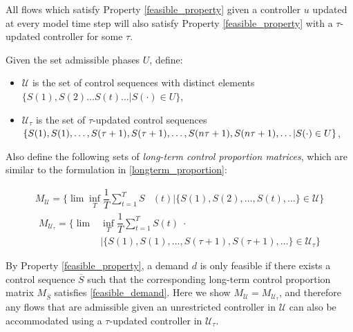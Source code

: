 \label{tauadmissible}
\begin{Lem}
All flows which satisfy Property \ref{feasible_property} given a controller $u$ updated at every model time step will also satisfy Property \ref{feasible_property} with a $\tau$-updated controller for some $\tau$. 
\end{Lem}
\begin{IEEEproof}
Given the set admissible phases $U$, define:
\begin{itemize}
\item $\mathcal U$ is the set of control sequences with distinct elements $\{S(1), S(2) \ldots S(t) \ldots |  S(\cdot) \in U\} $,
\item $\mathcal U_{\tau}$ is the set of $\tau$-updated control sequences $\{S(1), S(1), \ldots ,  S(\tau + 1),S(\tau + 1), \ldots , S(n\tau + 1), \\  S(n\tau + 1), \ldots |  S(\cdot) \in U\} $, 
\end{itemize}
Also define the following sets of \emph{long-term control proportion matrices}, which are similar to the formulation in \eqref{longterm_proportion}:
\vspace{-.5em}
\begin{small}
\begin{align*} M_{\mathcal U} = \Big\{\lim \inf_{T}\dfrac{1}{T}\sum_{t=1}^{T}  S&(t)  \Big| \{S(1), S(2), \ldots, S(t), \ldots \}\in \mathcal U \Big\} \end{align*}
\vspace{-1em}
\begin{align*} M_{\mathcal U_\tau} = \Big\{\lim&\inf_{T} \dfrac{1}{T}\sum_{t=1}^{T} S(t) \; \cdot \\ 
& \Big|\{S(1), S(1), \ldots,  S(\tau+1),S(\tau+1), \ldots\}\in \mathcal U_{\tau} \Big\} \end{align*}
\end{small}
By Property \ref{feasible_property}, a demand $d$ is only feasible if there exists a control sequence $\overline {S}$ such that the corresponding long-term control proportion matrix $M_{\overline {S}}$ satisfies \eqref{feasible_demand}. Here we show $M_{\mathcal U} = M_{\mathcal{U_\tau}}$, and therefore any flows that are admissible given an unrestricted controller in $\mathcal U$ can also be accommodated using a $\tau$-updated controller in $\mathcal{U}_\tau$. 


\end{IEEEproof}
